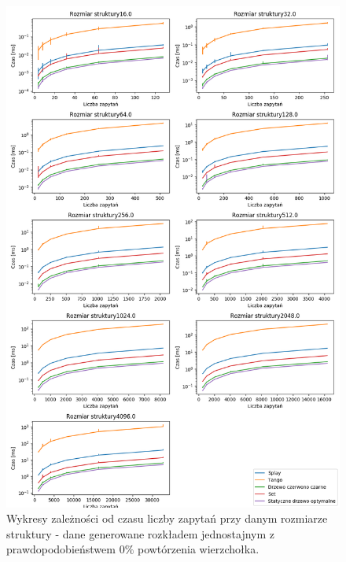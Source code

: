 \documentclass[declaration,shortabstract]{iithesis}
\theoremstyle{thm}
\theoremstyle{remark}
\theoremstyle{plain}
\theoremstyle{plain}
\theoremstyle{plain}
\begin{document}
\begin{figure}[H]  
\centering
    \includegraphics[scale=0.5]{wykresy/uniform100.png}
      \caption{Wykresy zależności od czasu liczby zapytań przy danym rozmiarze struktury - dane generowane rozkładem jednostajnym z prawdopodobieństwem  \(0\%\) powtórzenia wierzchołka. }  
    \label{fig:zigzig} 
\end{figure}
\end{document}
